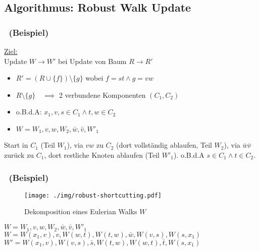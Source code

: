 \subsection{Algorithmus: Robust Walk Update}

\begin{frame}
    \frametitle{\insertsubsection~(Beispiel)}
    \underline{Ziel:}\\
    \vspace{.7em}
    Update $W \rightarrow W'$ bei Update von Baum $R \rightarrow R'$
    \vspace{.7em}
    \begin{itemize}
        \itemsep\setlength{.7em}
        \item $R' = (R \cup \{f\}) \setminus \{g\}$ wobei $f = st \wedge g =vw$
        \item $R \setminus \{g\} \quad \implies$ 2 verbundene Komponenten $(C_1, C_2)$
        \item o.B.d.A: $x_1, v, s \in C_1 \wedge t, w \in C_2$
        \item $W = W_1,v,w,W_2,\bar{w},\bar{v},W'_1$
    \end{itemize}
    \vspace{.7em}
    Start in $C_1$ (Teil $W_1$), via $vw$ zu $C_2$ (dort vollständig ablaufen, Teil $W_2$), via $\bar{w}\bar{v}$ zurück zu $C_1$, dort restliche Knoten ablaufen (Teil $W'_1$). o.B.d.A $s\in C_1 \wedge t \in C_2$.
\end{frame}

\begin{frame}
    \frametitle{\insertsubsection~(Beispiel)}
    \begin{figure}
        \centering
        \texttt{[image: ./img/robust-shortcutting.pdf]}
        \caption{Dekomposition eines Eulerian Walks $W$~\cite{recourse2016}}
    \end{figure}
    \center
    $W = W_1,v,w,W_2,\bar{w},\bar{v},W'_1$\\
    \vspace{.5em}
    $W = W(x_1, v), v, W(w, t), W(t, w), \bar{w}, W(v, s), W(s, x_1)$\\
    \vspace{.5em}
    $W' = W(x_1, v), W(v, s), \bar{s}, W(t, w), W(w, t), \bar{t}, W(s, x_1)$
\end{frame}

